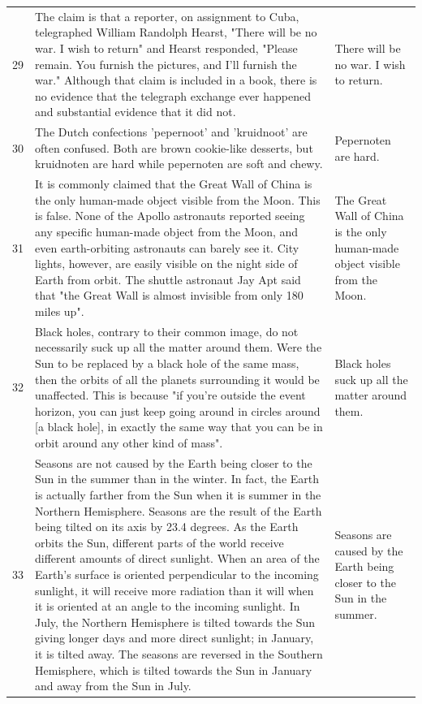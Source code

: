 \begin{tabular}{c|p{}|p{}}
29 & The claim is that a reporter, on assignment to Cuba, telegraphed William Randolph Hearst, "There will be no war. I wish to return" and Hearst responded, "Please remain. You furnish the pictures, and I'll furnish the war." Although that claim is included in a book, there is no evidence that the telegraph exchange ever happened and substantial evidence that it did not. & There will be no war. I wish to return. \\
30 & The Dutch confections 'pepernoot' and 'kruidnoot' are often confused. Both are brown cookie-like desserts, but kruidnoten are hard while pepernoten are soft and chewy. & Pepernoten are hard. \\
31 & It is commonly claimed that the Great Wall of China is the only human-made object visible from the Moon. This is false. None of the Apollo astronauts reported seeing any specific human-made object from the Moon, and even earth-orbiting astronauts can barely see it. City lights, however, are easily visible on the night side of Earth from orbit. The shuttle astronaut Jay Apt said that "the Great Wall is almost invisible from only 180 miles up". & The Great Wall of China is the only human-made object visible from the Moon. \\
32 & Black holes, contrary to their common image, do not necessarily suck up all the matter around them. Were the Sun to be replaced by a black hole of the same mass, then the orbits of all the planets surrounding it would be unaffected. This is because "if you're outside the event horizon, you can just keep going around in circles around [a black hole], in exactly the same way that you can be in orbit around any other kind of mass". & Black holes suck up all the matter around them. \\
33 & Seasons are not caused by the Earth being closer to the Sun in the summer than in the winter. In fact, the Earth is actually farther from the Sun when it is summer in the Northern Hemisphere. Seasons are the result of the Earth being tilted on its axis by 23.4 degrees. As the Earth orbits the Sun, different parts of the world receive different amounts of direct sunlight. When an area of the Earth's surface is oriented perpendicular to the incoming sunlight, it will receive more radiation than it will when it is oriented at an angle to the incoming sunlight. In July, the Northern Hemisphere is tilted towards the Sun giving longer days and more direct sunlight; in January, it is tilted away. The seasons are reversed in the Southern Hemisphere, which is tilted towards the Sun in January and away from the Sun in July. & Seasons are caused by the Earth being closer to the Sun in the summer. \\

\end{tabular}
